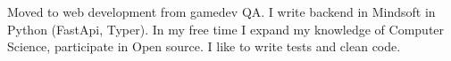 \hspace{0.2in}Moved to web development from gamedev QA.
I write backend in Mindsoft in Python (FastApi, Typer).
In my free time I expand my knowledge of Computer Science,
participate in Open source. I like to write tests and clean code.

